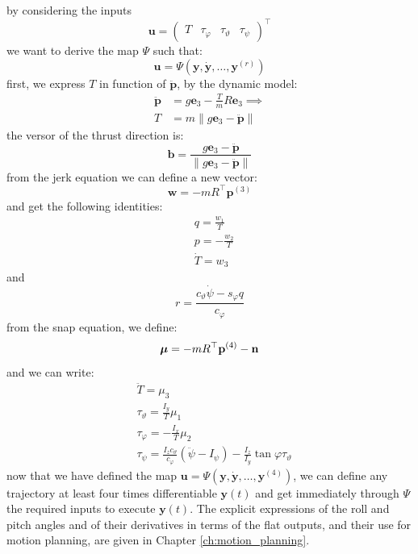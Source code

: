 \documentclass[10pt, a4paper]{report}
\begin{document}
by considering the inputs\begin{equation}
    \mathbf u=\begin{pmatrix}
        T&\tau_\varphi&\tau_\vartheta&\tau_\psi
    \end{pmatrix}^\top
\end{equation}
we want to derive the map $\Psi$ such that:\begin{equation}
    \mathbf u = \Psi(\mathbf y,\dot{\mathbf y},\dots, \mathbf y^{(r)})
\end{equation}
first, we express $T$ in function of $\ddot{\mathbf p}$, by the dynamic model:\begin{align}
    \ddot{\mathbf p}&=g\mathbf e_3-\frac{T}{m}R\mathbf e_3\implies \\
    T&=m\|g\mathbf e_3-\ddot{\mathbf p}\|
\end{align}
the versor of the thrust direction is:\begin{equation}
    \mathbf b = \frac{g\mathbf e_3-\ddot{\mathbf p}}{\|g\mathbf e_3-\ddot{\mathbf p}\|}
\end{equation}
from the jerk equation we can define a new vector:\begin{equation}
    \mathbf w = -mR^\top\mathbf p^{(3)}
\end{equation}
and get the following identities:\begin{align}
    &q=\frac{w_1}{T}\\ 
    &p=-\frac{w_2}{T}\\ 
    &\dot T = w_3
\end{align}
and\begin{equation}
    r=\frac{c_\vartheta\dot\psi-s_\varphi q}{c_\varphi}
\end{equation}
from the snap equation, we define:\begin{equation}
    {\boldsymbol{\mu}}=-mR^\top\mathbf p^{(4)}-\mathbf n
\end{equation}
and we can write:\begin{align}
    &\ddot T = \mu_3\\ 
    &\tau_\vartheta=\frac{I_y}{T}\mu_1\\ 
    &\tau_\varphi = -\frac{I_x}{T}\mu_2\\ 
    &\tau_\psi=\frac{I_zc_\vartheta}{c_\varphi}(\ddot\psi-I_\psi)-\frac{I_z}{I_y}\tan\varphi\tau_\vartheta
\end{align}
now that we have defined the map $\mathbf u=\Psi(\mathbf y,\dot{\mathbf y},\dots, \mathbf y^{(4)})$, we can define any trajectory at least four times differentiable $\mathbf y(t)$ and get immediately through $\Psi$ the required inputs to execute $\mathbf y(t)$. The explicit expressions of the roll and pitch angles and of their derivatives in terms of the flat outputs, and their use for motion planning, are given in Chapter \ref{ch:motion_planning}.
\end{document}
